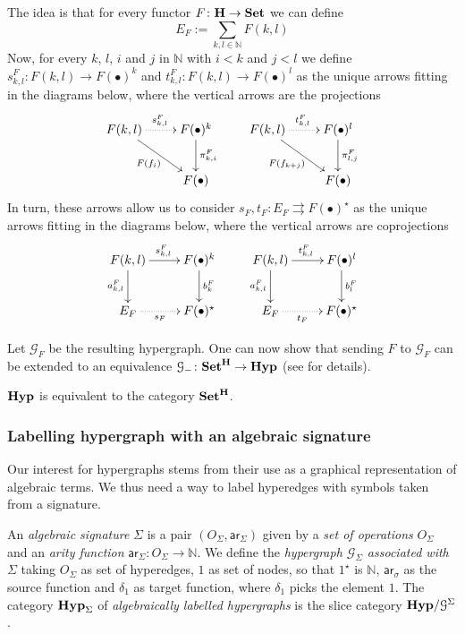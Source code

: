 \documentclass[a4paper,UKenglish,cleveref,pdftex,thm-restate,numberwithinsect]{lipics-v2021}
\newcommand{\Set}{\mathbf{Set}}
\newcommand{\catname}[1]{\textbf{\textup{#1}}}
\newcommand{\hyp}{\catname{Hyp}}
\newcommand{\hyps}{\catname{Hyp}_{\Sigma}}
\newcommand{\ari}{\mathsf{ar}}
\begin{document}
The idea is that for every functor $F\colon \catname{H}\to \catname{Set}$ we can define
\[E_F:=\sum_{k,l\in \mathbb{N}}F(k,l)\]
%
Now, for every $k$, $l$, $i$ and $j$ in $\mathbb{N}$ with $i< k$ and $j< l$ we define $s^F_{k,l}\colon F(k,l)\to F(\bullet)^k$ and  $t^F_{k,l}\colon F(k,l)\to F(\bullet)^l$ as the unique arrows fitting in the diagrams below, where the vertical arrows are the projections
\[\xymatrix{F(k,l)  \ar@{.>}[r]^{s^F_{k,l}} \ar[dr]_{F(f_i)}& F(\bullet)^{k} \ar[d]^{\pi^F_{k,i}} & F(k,l) \ar@{.>}[r]^{t^F_{k,l}} \ar[dr]_{F(f_{k+j})} & F(\bullet)^{l} \ar[d]^{\pi^F_{l,j}} \\ & F(\bullet) && F(\bullet)}\]
%
In turn, these arrows allow us to consider
$s_F, t_F\colon E_F\rightrightarrows F(\bullet)^{\star}$ as the unique arrows fitting in the diagrams below, where the vertical arrows are coprojections
\[\xymatrix{F(k,l) \ar[d]_{a^F_{k,l}}  \ar[r]^{s^{F}_{k,l}}& F(\bullet)^{k} \ar[d]^{b^F_{k}} & F(k,l) \ar[d]_{a^F_{k,l}}  \ar[r]^{t^{F}_{k,l}}& F(\bullet)^{l} \ar[d]^{b^F_{l}}\\ E_F \ar@{.>}[r]_-{s_F}& F(\bullet)^\star & E_F \ar@{.>}[r]_-{t_F}& F(\bullet)^\star}\]

Let $\mathcal{G}_F$ be the resulting hypergraph. One can now show that  sending $F$ to $\mathcal{G}_F$ can be extended to an equivalence $\mathcal{G}_{-}\colon \Set^{\catname{H}}\to \hyp$ (see \cite{castelnovo2023thesis,CastelnovoGM24} for details).


\begin{proposition}
	$\hyp$ is equivalent to the category $\Set^{\catname{H}}$.
\end{proposition}

\subsubsection{Labelling hypergraph with an algebraic signature}\label{sssect:hyp_alg_sign}

Our interest for hypergraphs stems from their use as a graphical representation of algebraic terms. We thus need a way to label hyperedges with symbols taken from a signature.

\begin{definition}
An \emph{algebraic signature} $\Sigma$ is a pair $(O_\Sigma, \ari_\Sigma)$ given by a \emph{set of operations} $O_\Sigma$ and an \emph{arity function} $\ari_\Sigma\colon O_\Sigma \to \mathbb{N}$. 
%
We define the \emph{hypergraph $\mathcal{G}_\Sigma$ associated with $\Sigma$} taking $O_\Sigma$ as set of hyperedges, $1$ as set of nodes, so that $1^\star$ is $\mathbb{N}$, $\ari_\sigma$ as the source function and $\delta_1$ as target function, where $\delta_1$ picks the element $1$. The category $\hyps$ of \emph{algebraically labelled hypergraphs} is the slice category $\hyp/\mathcal{G}^\Sigma$.
\end{definition}
\end{document}
